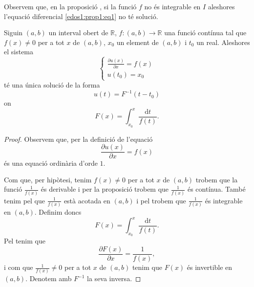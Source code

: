 \documentclass[../Apunts.tex]{subfiles}
\begin{document}
	\begin{observation}
		Observem que, en la proposició , si la funció \(f\) no és integrable en \(I\) aleshores l'equació diferencial \eqref{edos1:prop1:eq1} no té solució. %
	\end{observation}
	\begin{proposition}
		\label{prop:problema de Cauchy}
		Siguin \((a,b)\) un interval obert de \(\mathbb{R}\), \(f\colon(a,b)\longrightarrow\mathbb{R}\) una funció contínua tal que \(f(x)\neq0\) per a tot \(x\) de \((a,b)\), \(x_{0}\) un element de \((a,b)\) i \(t_{0}\) un real. Aleshores el sistema
		\begin{equation}
			\label{prop:problema de Cauchy:eq1}
			\begin{cases}
				\displaystyle \frac{\partial u(x)}{\partial x}=f(x) \\
				\displaystyle u(t_{0})=x_{0}
			\end{cases}
		\end{equation}
		té una única solució de la forma
		\[u(t)=F^{-1}(t-t_{0})\]
		on
		\[F(x)=\int_{x_{0}}^{x}\frac{\text{d}t}{f(t)}.\]
		\begin{proof}
			Observem que, per la definició de  l'equació
			\[\frac{\partial u(x)}{\partial x}=f(x)\]
			és una equació ordinària d'orde \(1\).
			
			Com que, per hipòtesi, tenim \(f(x)\neq0\) per a tot \(x\) de \((a,b)\) trobem que la funció \(\frac{1}{f(x)}\) és derivable %
			i per la proposició  trobem que \(\frac{1}{f(x)}\) és contínua. També tenim pel  que \(\frac{1}{f(x)}\) està acotada en \((a,b)\) i pel  trobem que \(\frac{1}{f(x)}\) és integrable en \((a,b)\). Definim doncs
			\[F(x)=\int_{x_{0}}^{x}\frac{\text{d}t}{f(t)}.\]
			Pel  tenim que
			\begin{equation}
				\label{prop:problema de Cauchy:eq2}
				\frac{\partial F(x)}{\partial x}=\frac{1}{f(x)},
			\end{equation}                
			i com que \(\frac{1}{f(x)}\neq0\) per a tot \(x\) de \((a,b)\) tenim que \(F(x)\) és invertible en \((a,b)\). Denotem amb \(F^{-1}\) la seva inversa.
			

\end{proof}
\end{proposition}
\end{document}
